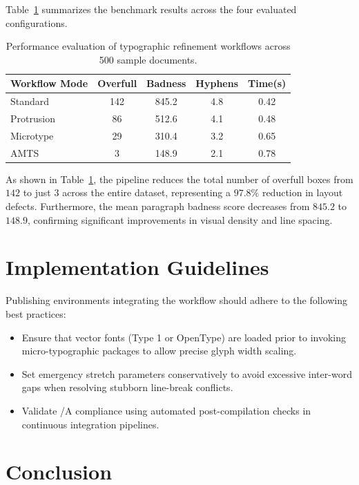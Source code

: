 \documentclass{ltugboat}
\begin{document}
Table~\ref{tab:benchmarks} summarizes the benchmark results across the four evaluated configurations.

\begin{table}[htbp]
\caption{Performance evaluation of typographic refinement workflows across 500 sample documents.}
\label{tab:benchmarks}
\centering
\footnotesize
\begin{tabular}{@{}lcccc@{}}
\toprule
\textbf{Workflow Mode} & \textbf{Overfull} & \textbf{Badness} & \textbf{Hyphens} & \textbf{Time(s)} \\
\midrule
Standard & 142 & 845.2 & 4.8 & 0.42 \\{}
Protrusion & 86 & 512.6 & 4.1 & 0.48 \\{}
Microtype & 29 & 310.4 & 3.2 & 0.65 \\{}
AMTS & 3 & 148.9 & 2.1 & 0.78 \\
\bottomrule
\end{tabular}
\end{table}

As shown in Table~\ref{tab:benchmarks}, the  pipeline reduces the total number of overfull boxes from $142$ to just $3$ across the entire dataset, representing a $97.8\%$ reduction in layout defects. Furthermore, the mean paragraph badness score decreases from $845.2$ to $148.9$, confirming significant improvements in visual density and line spacing.

\section{Implementation Guidelines}

Publishing environments integrating the  workflow should adhere to the following best practices:
\begin{itemize}
\item Ensure that vector fonts (Type 1 or OpenType) are loaded prior to invoking micro-typographic packages to allow precise glyph width scaling.
\item Set emergency stretch parameters conservatively to avoid excessive inter-word gaps when resolving stubborn line-break conflicts.
\item Validate /A compliance using automated post-compilation checks in continuous integration pipelines.
\end{itemize}

\section{Conclusion}
\end{document}
